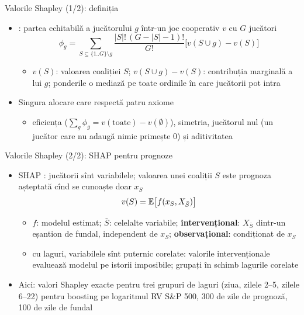 \begin{frame}{Valorile Shapley (1/2): definiția}
\itemsize{\small}
\begin{itemize}
    \item {}: partea echitabilă a jucătorului $g$ într-un joc cooperativ $v$ cu $G$ jucători
    \[ \phi_g = \sum_{S \subseteq \{1..G\}\setminus g}\frac{|S|!\,(G - |S| - 1)!}{G!}\big[v(S\cup g) - v(S)\big] \]
    \begin{itemize}
        \item $v(S)$: valoarea coaliției $S$; $v(S\cup g) - v(S)$: contribuția marginală a lui $g$; ponderile o mediază pe toate ordinile în care jucătorii pot intra
    \end{itemize}
    \item Singura alocare care respectă patru axiome
    \begin{itemize}
        \item eficiența ($\sum_g\phi_g = v(\mathrm{toate}) - v(\emptyset)$), simetria, jucătorul nul (un jucător care nu adaugă nimic primește 0) și aditivitatea
    \end{itemize}
\end{itemize}
\end{frame}

\begin{frame}{Valorile Shapley (2/2): SHAP pentru prognoze}
\itemsize{\small}
\begin{itemize}
    \item SHAP : jucătorii sînt variabilele; valoarea unei coaliții $S$ este prognoza așteptată cînd se cunoaște doar $x_S$
    \[ v(S) = \mathbb{E}\big[f(x_S, X_{\bar S})\big] \]
    \begin{itemize}
        \item $f$: modelul estimat; $\bar S$: celelalte variabile; \textbf{intervențional}: $X_{\bar S}$ dintr-un eșantion de fundal, independent de $x_S$; \textbf{observațional}: condiționat de $x_S$
        \item cu laguri, variabilele sînt puternic corelate: valorile intervenționale evaluează modelul pe istorii imposibile; grupați în schimb lagurile corelate
    \end{itemize}
    \item Aici: valori Shapley exacte pentru trei grupuri de laguri (ziua, zilele 2--5, zilele 6--22) pentru boosting pe logaritmul RV S\&P 500, 300 de zile de prognoză, 100 de zile de fundal
\end{itemize}
\end{frame}

